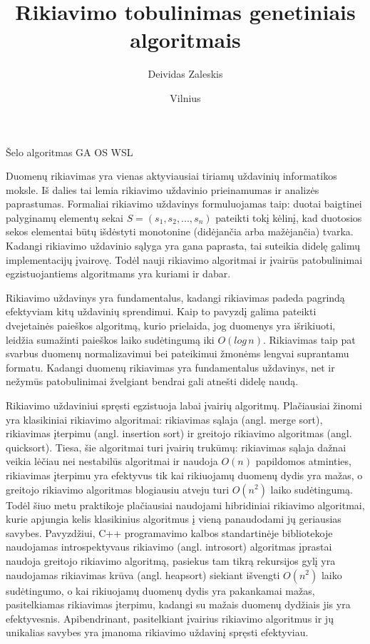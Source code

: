 \documentclass{VUMIFInfBakalaurinis}
\institute{Informatikos institutas}
\title{Rikiavimo tobulinimas genetiniais algoritmais}
\author{Deividas Zaleskis}
\date{Vilnius \\ \the\year}
\begin{document}
\maketitle

\tableofcontents


Šelo algoritmas
GA
OS
WSL


Duomenų rikiavimas yra vienas aktyviausiai tiriamų uždavinių informatikos moksle.
Iš dalies tai lemia rikiavimo uždavinio prieinamumas ir analizės paprastumas.
Formaliai rikiavimo uždavinys formuluojamas taip:
duotai baigtinei palyginamų elementų sekai $S = (s_1, s_2, ..., s_n)$ pateikti tokį
kėlinį, kad duotosios sekos elementai būtų išdėstyti monotonine (didėjančia arba mažėjančia) tvarka.
Kadangi rikiavimo uždavinio sąlyga yra gana paprasta, tai suteikia didelę galimų implementacijų įvairovę.
Todėl nauji rikiavimo algoritmai ir įvairūs patobulinimai egzistuojantiems algoritmams yra kuriami ir dabar.

Rikiavimo uždavinys yra fundamentalus, kadangi rikiavimas padeda pagrindą efektyviam kitų uždavinių sprendimui.
Kaip to pavyzdį galima pateikti dvejetainės paieškos algoritmą, kurio prielaida,
jog duomenys yra išrikiuoti, leidžia sumažinti paieškos laiko sudėtingumą iki $O(log\,n)$.
Rikiavimas taip pat svarbus duomenų normalizavimui bei pateikimui žmonėms lengvai suprantamu formatu.
Kadangi duomenų rikiavimas yra fundamentalus uždavinys, net ir nežymūs patobulinimai žvelgiant bendrai
gali atnešti didelę naudą.

Rikiavimo uždaviniui spręsti egzistuoja labai įvairių algoritmų.
Plačiausiai žinomi yra klasikiniai rikiavimo algoritmai: rikiavimas sąlaja (angl. merge sort), rikiavimas įterpimu (angl. insertion sort) ir greitojo rikiavimo algoritmas (angl. quicksort).
Tiesa, šie algoritmai turi įvairių trukūmų:
rikiavimas sąlaja dažnai veikia lėčiau nei nestabilūs algoritmai ir naudoja $O(n)$ papildomos atminties, rikiavimas įterpimu yra efektyvus tik kai rikiuojamų duomenų dydis yra mažas, o
greitojo rikiavimo algoritmas blogiausiu atveju turi $O(n^2)$ laiko sudėtingumą.
Todėl šiuo metu praktikoje plačiausiai naudojami hibridiniai rikiavimo algoritmai, kurie apjungia kelis klasikinius algoritmus į vieną panaudodami jų geriausias savybes.
Pavyzdžiui, C++ programavimo kalbos standartinėje bibliotekoje naudojamas introspektyvaus rikiavimo (angl. introsort) algoritmas įprastai naudoja greitojo rikiavimo algoritmą,
pasiekus tam tikrą rekursijos gylį yra naudojamas rikiavimas krūva (angl. heapsort) siekiant išvengti $O(n^2)$ laiko sudėtingumo,
o kai rikiuojamų duomenų dydis yra pakankamai mažas, pasitelkiamas rikiavimas įterpimu, kadangi su mažais duomenų dydžiais jis yra efektyvesnis.
Apibendrinant, pasitelkiant įvairius rikiavimo algoritmus ir jų unikalias savybes yra įmanoma rikiavimo uždavinį spręsti efektyviau.
\end{document}
